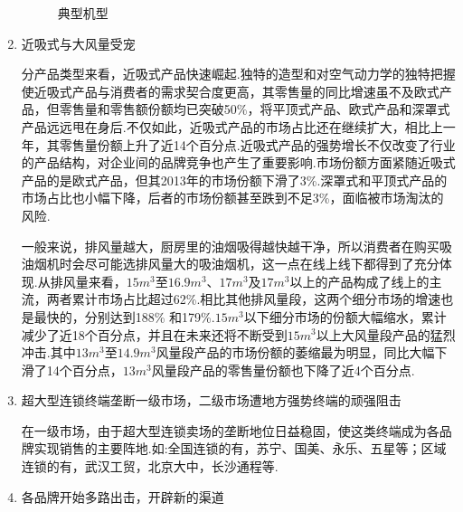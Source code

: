 \begin{enumerate}
      \begin{figure}[H]
      \centering
      \caption{典型机型}
      \label{典型机型}
      \end{figure}

\item 近吸式与大风量受宠

      分产品类型来看，近吸式产品快速崛起.独特的造型和对空气动力学的独特把握使近吸式产品与消费者的需求契合度更高，其零售量的同比增速虽不及欧式产品，但零售量和零售额份额均已突破50\%，将平顶式产品、欧式产品和深罩式产品远远甩在身后.不仅如此，近吸式产品的市场占比还在继续扩大，相比上一年，其零售量份额上升了近14个百分点.近吸式产品的强势增长不仅改变了行业的产品结构，对企业间的品牌竞争也产生了重要影响.市场份额方面紧随近吸式产品的是欧式产品，但其2013年的市场份额下滑了3\%.深罩式和平顶式产品的市场占比也小幅下降，后者的市场份额甚至跌到不足3\%，面临被市场淘汰的风险.

      一般来说，排风量越大，厨房里的油烟吸得越快越干净，所以消费者在购买吸油烟机时会尽可能选排风量大的吸油烟机，这一点在线上线下都得到了充分体现.从排风量来看，$15m^3$至$16.9m^3$、$17m^3$及$17m^3$以上的产品构成了线上的主流，两者累计市场占比超过62\%.相比其他排风量段，这两个细分市场的增速也是最快的，分别达到188\% 和179\%.$15m^3$以下细分市场的份额大幅缩水，累计减少了近18个百分点，并且在未来还将不断受到$15m^3$以上大风量段产品的猛烈冲击.其中$13m^3$至$14.9m^3$风量段产品的市场份额的萎缩最为明显，同比大幅下滑了14个百分点，$13m^3$风量段产品的零售量份额也下降了近4个百分点.

\item 超大型连锁终端垄断一级市场，二级市场遭地方强势终端的顽强阻击

      在一级市场，由于超大型连锁卖场的垄断地位日益稳固，使这类终端成为各品牌实现销售的主要阵地.如:全国连锁的有，苏宁、国美、永乐、五星等；区域连锁的有，武汉工贸，北京大中，长沙通程等.

\item 各品牌开始多路出击，开辟新的渠道


\end{enumerate}
